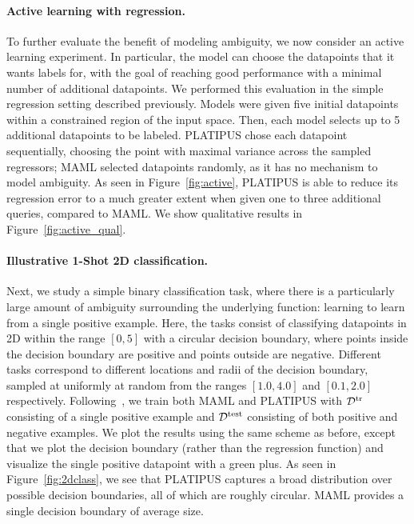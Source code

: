\documentclass{article}
\begin{document}
\paragraph{Active learning with regression.} To further evaluate the benefit of modeling
ambiguity, we now consider an active learning experiment.
In particular, the model can choose the datapoints that it wants labels for, with the goal of reaching good performance with a minimal number of additional datapoints. We performed this evaluation in the simple regression setting described previously. Models were given five initial datapoints within a constrained region of the input space. Then, each model selects up to 5 additional datapoints to be labeled. PLATIPUS chose each datapoint sequentially, choosing the point with maximal variance across the sampled regressors; MAML selected datapoints randomly, as it has no mechanism to model ambiguity. As seen in Figure~\ref{fig:active}, PLATIPUS is able to reduce its regression error to a much greater extent when given one to three additional queries, compared to MAML. We show qualitative results in Figure~\ref{fig:active_qual}.





\vspace{-0.1in}
\paragraph{Illustrative 1-Shot 2D classification.}
Next, we study a simple binary classification task, where there is a particularly large amount of ambiguity surrounding the underlying function: learning to learn from a single positive example. Here, the tasks consist of classifying datapoints in 2D within the range $[0,5]$ with a circular decision boundary, where points inside the decision boundary are positive and points outside are negative. Different tasks correspond to different locations and radii of the decision boundary, sampled at uniformly at random from the ranges $[1.0, 4.0]$ and $[0.1,2.0]$ respectively.
Following~\citet{grant2017workshop}, we train both MAML and PLATIPUS with $\mathcal{D}^\text{tr}$ consisting of a single positive example and $\mathcal{D}^\text{test}$ consisting of both positive and negative examples.
We plot the results using the same scheme as before, except that we plot the decision boundary (rather than the regression function) and visualize the single positive datapoint with a green plus. As seen in Figure~\ref{fig:2dclass}, we see that PLATIPUS captures a broad distribution over possible decision boundaries, all of which are roughly circular. MAML provides a single decision boundary of average size.
\end{document}
